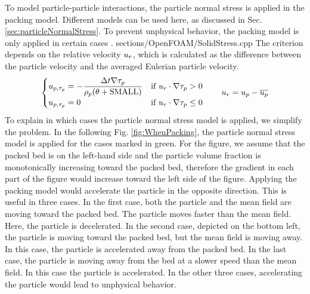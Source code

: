 To model particle-particle interactions, the particle normal stress is applied in the packing model.
Different models can be used here, as discussed in Sec. \ref{sec:particleNormalStress}.
To prevent unphysical behavior, the packing model is only applied in certain cases \cite{MPInterpolation}.
{sections/OpenFOAM/SolidStress.cpp}
The criterion depends on the relative velocity $u_r$, which is calculated as the difference between the particle velocity and the averaged Eulerian particle velocity.
\begin{align}
    \begin{cases}
        u_{p,\tau_p} = - \dfrac{\Delta t \nabla \tau_p}{\rho_p (\theta + \operatorname{SMALL})} & \text{if } u_r \cdot \nabla \tau_p > 0  \\
        u_{p,\tau_p} = 0 & \text{if } u_r \cdot \nabla \tau_p \leq 0
    \end{cases} \qquad u_r = u_p - \overline{u_p}
\end{align}
To explain in which cases the particle normal stress model is applied, we simplify the problem. In the following Fig. \ref{fig:WhenPacking}, the particle normal stress model is applied for the cases marked in green.
For the figure, we assume that the packed bed is on the left-hand side and the particle volume fraction is monotonically increasing toward the packed bed, therefore the gradient in each part of the figure would increase toward the left side of the figure.
Applying the packing model would accelerate the particle in the opposite direction. 
This is useful in three cases.
In the first case, both the particle and the mean field are moving toward the packed bed. The particle moves faster than the mean field. Here, the particle is decelerated.
In the second case, depicted on the bottom left, the particle is moving toward the packed bed, but the mean field is moving away. In this case, the particle is accelerated away from the packed bed.
In the last case, the particle is moving away from the bed at a slower speed than the mean field. In this case the particle is accelerated.
In the other three cases, accelerating the particle would lead to unphysical behavior.

